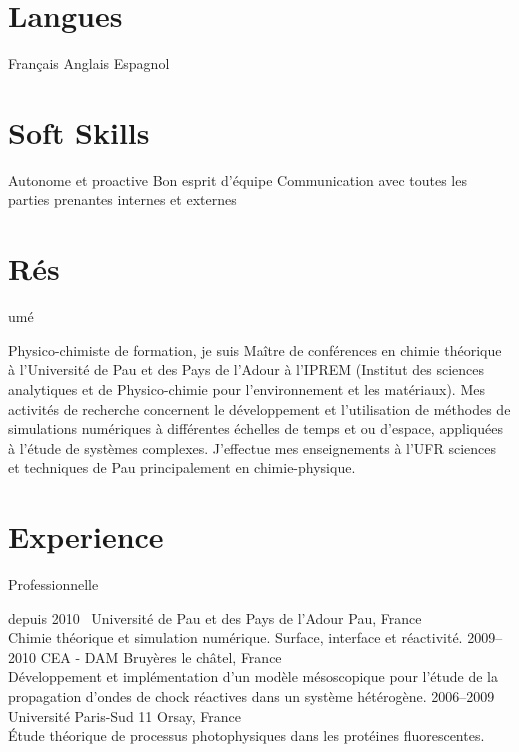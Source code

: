 \documentclass{cv-style}     %
\begin{document}
\begin{aside}
    \section{Langues}
    Français 
    Anglais 
    Espagnol
    \section{Soft Skills}
    Autonome et proactive
    Bon esprit d'équipe
    Communication avec toutes les parties prenantes
      internes et externes
\end{aside}

\section{Rés}{umé}

Physico-chimiste de formation, je suis Maître de conférences en chimie théorique
 à l'Université de Pau et des Pays de l'Adour à l'IPREM (Institut des sciences
 analytiques et de Physico-chimie pour l'environnement et les matériaux). Mes activités de
recherche concernent le développement et l'utilisation de méthodes de simulations
numériques à
différentes échelles de temps et ou d'espace, appliquées
à l'étude de systèmes complexes. J'effectue mes enseignements à l'UFR sciences et
techniques de Pau principalement en chimie-physique.

\section{Experience}{ Professionnelle}

\begin{entrylist}
\entry
  {depuis 2010~}
  {Université de Pau et des Pays de l'Adour}
  {Pau, France}
  {\\
   Chimie théorique et simulation numérique.
   Surface, interface et réactivité.}
\entry
  {2009--2010}
  {CEA - DAM}
  {Bruyères le châtel, France}
  {
  \\
  Développement et implémentation d'un modèle mésoscopique pour l'étude de la propagation
  d'ondes de chock réactives dans un système hétérogène.
  }
\entry
  {2006--2009}
  {Université Paris-Sud 11}
  {Orsay, France}
  {
  \\
  Étude théorique de processus photophysiques dans les protéines fluorescentes.
  }
\end{entrylist}
\end{document}
